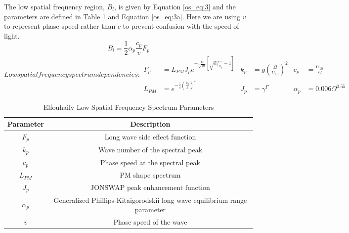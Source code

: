 The low spatial frequency region, $B_l$, is given by Equation \ref{os_eq:3} and the parameters are defined in Table \ref{os_tab:1} and Equation \ref{os_eq:3a}. Here we are using $v$ to represent phase speed rather than $c$ to prevent confusion with the speed of light.
\begin{equation}
  \label{os_eq:3}
 B_l = \frac{1}{2} \alpha_p \frac{c_p}{v} F_p
\end{equation}
\renewcommand{\baselinestretch}{2} \small\normalsize
\begin{subequations}
\label{os_eq:3a}
   Low spatial frequency spectrum dependencies:
\begin{align}
  F_p &= L_{PM}J_pe^{-\frac{\Omega}{\sqrt{10}}\left[\sqrt{k/_{k_p}} - 1 \right]} &  k_p &= g\left(\frac{\Omega}{U_{10}}\right)^2 & c_p &= \frac{U_{10}}{\Omega} \\
   L_{PM} &=e^{-\frac{5}{4}\left(\frac{k_p}{k} \right)^2} &  J_p &= \gamma^\Gamma  & \alpha_p &= 0.006\Omega^{0.55} 
\end{align}
\end{subequations}
\renewcommand{\baselinestretch}{2} \small\normalsize
\begin{table}[H]
  \begin{center}
      \renewcommand{\baselinestretch}{1} \small\normalsize
  \begin{quote}
    \caption[Elfouhaily Low Spatial Frequency Spectrum Parameters]{Elfouhaily Low Spatial Frequency Spectrum Parameters\label{os_tab:1}}
  \end{quote}
  \begin{tabular} {|c | c |}
    \hline
  \bf{Parameter} & \bf{Description} \\ \hline
  $F_p$ & Long wave side effect function \\ \hline
  $k_p$ &  Wave number of the spectral peak \\ \hline
  $c_p$ &  Phase speed at the spectral peak \\ \hline
  $L_{PM}$ & PM shape spectrum \\ \hline
  $J_p$ & JONSWAP peak enhancement function \\ \hline
  $\alpha_p$ & Generalized Phillips-Kitaigorodskii long wave equilibrium range parameter\\ \hline
  $v$ & Phase speed of the wave \\ \hline
\end{tabular}
\end{center}
\end{table}
\renewcommand{\baselinestretch}{2} \small\normalsize
